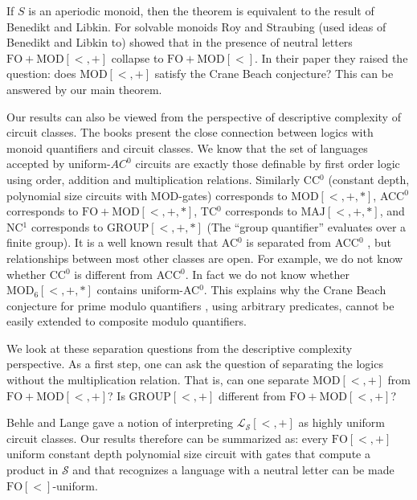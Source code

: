 \documentclass[envcountsame]{llncs}
\newcommand{\FO}{\mathrm{FO}}
\newcommand{\GROUP}{\mathrm{GROUP}}
\newcommand{\MOD}{\mathrm{MOD}}
\newcommand{\MAJ}{\mathrm{MAJ}}
\begin{document}
If $S$ is an aperiodic monoid, then the theorem is equivalent to the result of Benedikt and Libkin. 
For solvable monoids Roy and Straubing \cite{roy_defGenFO} 
(used ideas of Benedikt and Libkin to) showed that in the presence of neutral letters $\FO+\MOD[<,+]$  collapse to
$\FO+\MOD[<]$. In their paper they raised the question: does $\MOD[<,+]$ satisfy the Crane Beach conjecture?
This can be answered by our main theorem.

Our results can also be viewed from the perspective of descriptive complexity of circuit classes. The books
\cite{immerman_book, vollmer_book} present the close connection between logics with monoid quantifiers and circuit classes. 
We know that the set of languages accepted by uniform-$AC^0$ circuits
are exactly those definable by first order logic using order,
addition and multiplication relations. Similarly CC$^0$ (constant depth, polynomial size circuits with MOD-gates)
corresponds to $\MOD[<,+,*]$, ACC$^0$ corresponds to $\FO+\MOD[<,+,*]$, TC$^0$ corresponds to $\MAJ[<,+,*]$, 
and NC$^1$ corresponds to $\GROUP[<,+,*]$ (The ``group quantifier'' evaluates
over a finite group). It is a well known result that AC$^0$ is separated from ACC$^0$ \cite{furst_parity}, but relationships between 
most other classes are open. For example, we do not know whether CC$^0$ is different from ACC$^0$. In fact we do not know whether
$\MOD_6[<,+,*]$ contains uniform-AC$^0$. This explains why the Crane Beach conjecture for prime modulo quantifiers \cite{ltt06}, using
arbitrary predicates, cannot be easily extended to composite modulo quantifiers.

We look at these separation questions from the descriptive complexity
perspective. As a first step, one can ask the
question of separating the logics without the multiplication
relation. That is, can one separate $\MOD[<,+]$ from
$\FO+\MOD[<,+]$? Is $\GROUP[<,+]$ different from $\FO+\MOD[<,+]$? 

Behle and Lange \cite{behle_foLessUniform} gave a notion of interpreting $\mathcal{L_S}[<,+]$ as highly uniform circuit classes.  Our results therefore can be summarized as: every $\FO[<,+]$ uniform constant depth polynomial size circuit with gates that compute a product in $\mathcal{S}$ and that recognizes a language with a neutral letter can be made $\FO[<]$-uniform.
\end{document}
